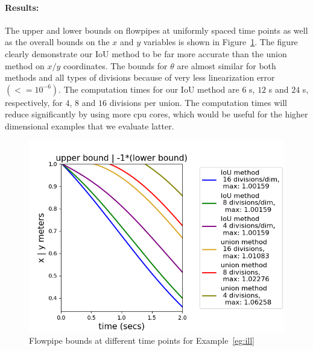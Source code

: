 \paragraph{Results:}  The upper and lower bounds on flowpipes at uniformly spaced time
points as well as the overall bounds on the $x$ and $y$ variables is
shown in Figure~\ref{fig:ill}.  The figure clearly demonstrate our IoU
method to be far more accurate than the union method on $x/y$
coordinates.  The bounds for $\theta$ are almost similar for both
methods and all types of divisions because of very less linearization
error $(<=10^{-6})$.  The computation times for our IoU method are $6$
s, $12$ s and $24$ s, respectively, for $4$, $8$ and $16$ divisions
per union.  The computation times will reduce significantly by using
more cpu cores, which would be useful for the higher dimensional
examples that we evaluate latter.
%
\begin{figure}
  \includegraphics[scale = 0.7]{illImages/Ub.png}
  \caption{Flowpipe bounds at different time points for
    Example~\ref{eg:ill}}
  \label{fig:ill}
\end{figure}
%

